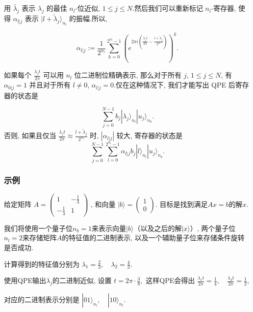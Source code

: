 用 $\tilde{\lambda_{j}}$ 表示 $\lambda_{j}$ 的最佳 $n_{l}$-位近似, $1\leq j\leq N$.然后我们可以重新标记 $n_{l}$-寄存器, 使得 $\alpha_{l|j}$ 表示 $|l + \tilde{\lambda}_{j}\rangle_{n_{l}}$ 的振幅.所以, 

\begin{equation}
	\alpha_{l|j} := \frac{1}{2^{n_{l}}}\sum_{k=0}^{2^{n_{l}}-1}\left(e^{2\pi i\left(\frac{\lambda_{j}t}{2\pi}-\frac{l+\tilde{\lambda}_{j}}{2^{n_{l}}}\right)}\right)^{k}.
\end{equation}

如果每个 $\frac{\lambda_{j}t}{2\pi}$ 可以用 $n_{l}$ 位二进制位精确表示, 那么对于所有 $j$, $1\leq j\leq N$, 有 $\alpha_{0|j}=1$ 并且对于所有 $l\neq 0$, $\alpha_{l|j}=0$.仅在这种情况下, 我们才能写出 QPE 后寄存器的状态是

\begin{equation}
	\sum_{j=0}^{N-1} b_{j}|\lambda_{j}\rangle_{n_{l}}|u_{j}\rangle_{n_{b}}.
\end{equation}
否则, 如果且仅当 $\frac{\lambda_{j}t}{2\pi}\approx\frac{l+\tilde{\lambda}_{j}}{2^{n_{l}}}$ 时, $|\alpha_{l|j}|$ 较大, 寄存器的状态是
\begin{equation}
	\sum_{j=0}^{N-1}\sum_{l=0}^{2^{n_{l}}-1}\alpha_{l|j}b_{j}|l\rangle_{n_{l}}|u_{j}\rangle_{n_{b}}.
\end{equation}

\subsubsection{示例}
给定矩阵
$
A = \begin{pmatrix}
	1 & -\frac{1}{3} \\
	-\frac{1}{3} & 1
\end{pmatrix}
$
, 和向量
$
|b\rangle = \begin{pmatrix}
	1 \\
	0
\end{pmatrix}
$.
目标是找到满足$Ax = b$的解$x$.

我们将使用一个量子位$n_b=1$来表示向量$|b\rangle$（以及之后的解$|x\rangle$）, 两个量子位$n_l=2$来存储矩阵$A$的特征值的二进制表示, 以及一个辅助量子位来存储条件旋转是否成功.

计算得到的特征值分别为
$
\lambda_1 = \frac{2}{3}, \quad \lambda_2 = \frac{4}{3}.
$

使用QPE输出$\lambda_j$的二进制近似, 设置
$
t = 2\pi \cdot \frac{3}{8},
$
这样QPE会得出
$
\frac{\lambda_1 t}{2\pi} = \frac{1}{4}, \quad \frac{\lambda_2 t}{2\pi} = \frac{1}{2},
$

对应的二进制表示分别是
$
|01\rangle_{n_l}, \quad |10\rangle_{n_l}.
$

